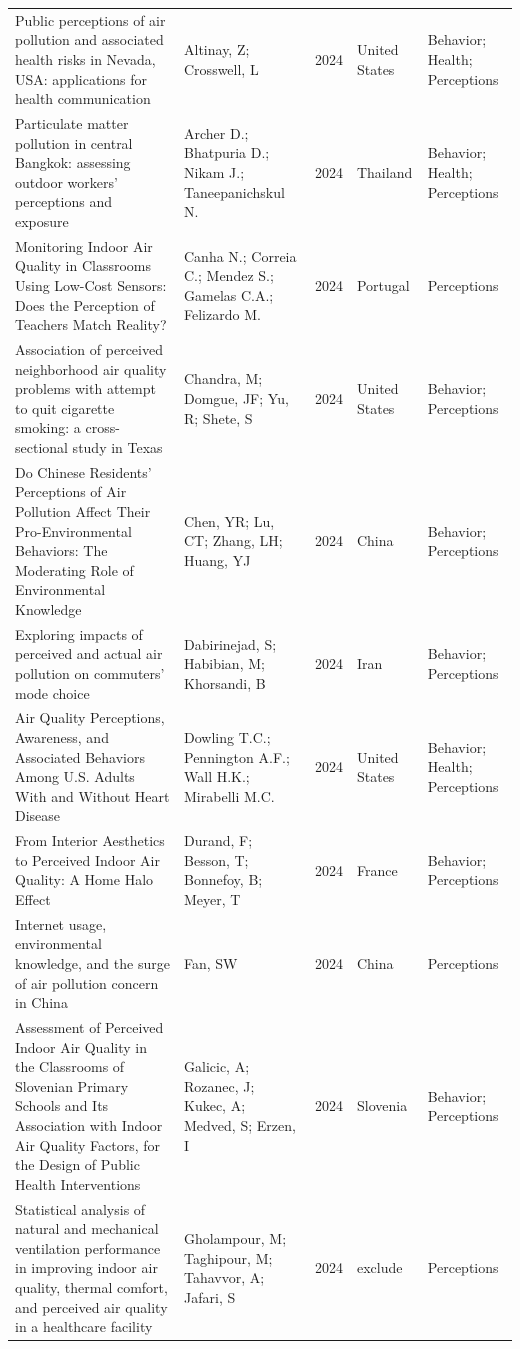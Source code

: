 {\begin{longtable}[t]{p{6cm}p{3cm}lp{3cm}p{3cm}}
Public perceptions of air pollution and associated health risks in Nevada, USA: applications for health communication & Altinay, Z; Crosswell, L & 2024 & United States & Behavior; Health; Perceptions\\
\addlinespace
Particulate matter pollution in central Bangkok: assessing outdoor workers' perceptions and exposure & Archer D.; Bhatpuria D.; Nikam J.; Taneepanichskul N. & 2024 & Thailand & Behavior; Health; Perceptions\\
Monitoring Indoor Air Quality in Classrooms Using Low-Cost Sensors: Does the Perception of Teachers Match Reality? & Canha N.; Correia C.; Mendez S.; Gamelas C.A.; Felizardo M. & 2024 & Portugal & Perceptions\\
Association of perceived neighborhood air quality problems with attempt to quit cigarette smoking: a cross-sectional study in Texas & Chandra, M; Domgue, JF; Yu, R; Shete, S & 2024 & United States & Behavior; Perceptions\\
Do Chinese Residents' Perceptions of Air Pollution Affect Their Pro-Environmental Behaviors: The Moderating Role of Environmental Knowledge & Chen, YR; Lu, CT; Zhang, LH; Huang, YJ & 2024 & China & Behavior; Perceptions\\
Exploring impacts of perceived and actual air pollution on commuters' mode choice & Dabirinejad, S; Habibian, M; Khorsandi, B & 2024 & Iran & Behavior; Perceptions\\
\addlinespace
Air Quality Perceptions, Awareness, and Associated Behaviors Among U.S. Adults With and Without Heart Disease & Dowling T.C.; Pennington A.F.; Wall H.K.; Mirabelli M.C. & 2024 & United States & Behavior; Health; Perceptions\\
From Interior Aesthetics to Perceived Indoor Air Quality: A Home Halo Effect & Durand, F; Besson, T; Bonnefoy, B; Meyer, T & 2024 & France & Behavior; Perceptions\\
Internet usage, environmental knowledge, and the surge of air pollution concern in China & Fan, SW & 2024 & China & Perceptions\\
Assessment of Perceived Indoor Air Quality in the Classrooms of Slovenian Primary Schools and Its Association with Indoor Air Quality Factors, for the Design of Public Health Interventions & Galicic, A; Rozanec, J; Kukec, A; Medved, S; Erzen, I & 2024 & Slovenia & Behavior; Perceptions\\
Statistical analysis of natural and mechanical ventilation performance in improving indoor air quality, thermal comfort, and perceived air quality in a healthcare facility & Gholampour, M; Taghipour, M; Tahavvor, A; Jafari, S & 2024 & exclude & Perceptions\\

\end{longtable}}
